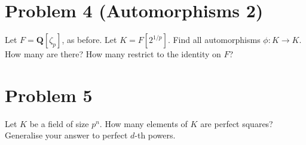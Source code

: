 \documentclass{amsart}
\begin{document}
\section{Problem 4 (Automorphisms 2)}
\label{sec:org8244df9}

Let \(F = \mathbf{Q}[\zeta_p]\), as before.
Let \(K = F[2^{1/p}]\).
Find all automorphisms \(\phi \colon K \to K\).
How many are there?
How many restrict to the identity on \(F\)?
\section{Problem 5}
\label{sec:orgaf19103}

Let \(K\) be a field of size \(p^n\).
How many elements of \(K\) are perfect squares?
Generalise your answer to perfect \(d\)-th powers.
\end{document}
